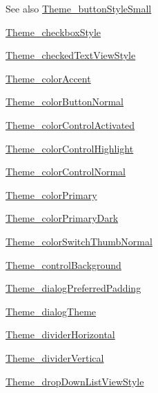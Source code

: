 \begin{DoxySeeAlso}{See also}
\hyperlink{classcheck_1_1test_1_1_r_1_1styleable_aaaa10bba1d9d98154b1920fc7823a5ed}{Theme\+\_\+button\+Style\+Small} 

\hyperlink{classcheck_1_1test_1_1_r_1_1styleable_a591338acd9ab74487b26ca7193e08bc4}{Theme\+\_\+checkbox\+Style} 

\hyperlink{classcheck_1_1test_1_1_r_1_1styleable_a3ea486b33baebd01084683194dba833d}{Theme\+\_\+checked\+Text\+View\+Style} 

\hyperlink{classcheck_1_1test_1_1_r_1_1styleable_a0066926f266b5ba28e4da64a5ee29bb9}{Theme\+\_\+color\+Accent} 

\hyperlink{classcheck_1_1test_1_1_r_1_1styleable_a3cf28f21d7d92dd03cab898e43cd3cf9}{Theme\+\_\+color\+Button\+Normal} 

\hyperlink{classcheck_1_1test_1_1_r_1_1styleable_a1d6c74771db390d0820612ca1d065c4d}{Theme\+\_\+color\+Control\+Activated} 

\hyperlink{classcheck_1_1test_1_1_r_1_1styleable_ac7b968aea5587a45f1935f379de1d8b7}{Theme\+\_\+color\+Control\+Highlight} 

\hyperlink{classcheck_1_1test_1_1_r_1_1styleable_a3fd140e79d5c291ac4ded3f747b333fd}{Theme\+\_\+color\+Control\+Normal} 

\hyperlink{classcheck_1_1test_1_1_r_1_1styleable_add0a3bacfd686c812b1d7045c47b17d5}{Theme\+\_\+color\+Primary} 

\hyperlink{classcheck_1_1test_1_1_r_1_1styleable_a06639297583ba9162a788c3513b9266c}{Theme\+\_\+color\+Primary\+Dark} 

\hyperlink{classcheck_1_1test_1_1_r_1_1styleable_a0380932431c2ed2292807679db341649}{Theme\+\_\+color\+Switch\+Thumb\+Normal} 

\hyperlink{classcheck_1_1test_1_1_r_1_1styleable_a8b78be6b3ea5c1a175341e08d853b1bd}{Theme\+\_\+control\+Background} 

\hyperlink{classcheck_1_1test_1_1_r_1_1styleable_a49869154ae939603270f1df062f8b8f5}{Theme\+\_\+dialog\+Preferred\+Padding} 

\hyperlink{classcheck_1_1test_1_1_r_1_1styleable_a25fd3dc52a7a1eab045aeadf0e4aa6c6}{Theme\+\_\+dialog\+Theme} 

\hyperlink{classcheck_1_1test_1_1_r_1_1styleable_acd0c530f019a2431d54c833109966ffb}{Theme\+\_\+divider\+Horizontal} 

\hyperlink{classcheck_1_1test_1_1_r_1_1styleable_a377c24517d2d2e1fec3897b381126055}{Theme\+\_\+divider\+Vertical} 

\hyperlink{classcheck_1_1test_1_1_r_1_1styleable_ab53b97b9568cde83dc65605a14dab2f4}{Theme\+\_\+drop\+Down\+List\+View\+Style} 


\end{DoxySeeAlso}
